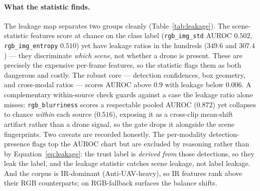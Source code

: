 \documentclass[12pt,a4paper,oneside,openright]{book}
\begin{document}
\paragraph{What the statistic finds.}
The leakage map separates two groups cleanly (Table~\ref{tab:leakage}). The scene-statistic features score at chance on the class label (\texttt{rgb\_img\_std} AUROC $0.502$, \texttt{rgb\_img\_entropy} $0.510$) yet have leakage ratios in the hundreds ($349.6$ and $307.4$) --- they discriminate \emph{which scene}, not whether a drone is present. These are precisely the expensive per-frame features, so the statistic flags them as both dangerous and costly. The robust core --- detection confidences, box geometry, and cross-modal ratios --- scores AUROC above $0.9$ with leakage below $0.006$. A complementary within-source check guards against a case the leakage ratio alone misses: \texttt{rgb\_blurriness} scores a respectable pooled AUROC ($0.872$) yet collapses to chance \emph{within} each source ($0.516$), exposing it as a cross-clip mean-shift artifact rather than a drone signal, so the gate drops it alongside the scene fingerprints. Two caveats are recorded honestly. The per-modality detection-presence flags top the AUROC chart but are excluded by reasoning rather than by Equation~\ref{eq:leakage}: the trust label is \emph{derived from} those detections, so they leak the label, and the leakage statistic catches scene leakage, not label leakage. And the corpus is IR-dominant (Anti-UAV-heavy), so IR features rank above their RGB counterparts; on RGB-fallback surfaces the balance shifts.
\end{document}
